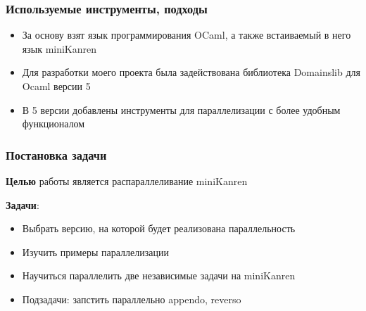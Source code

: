\documentclass{beamer}
\begin{document}
\begin{frame}
  \frametitle{Используемые инструменты, подходы}
  \begin{itemize}
    \item За основу взят язык программирования OCaml, а также встаиваемый в него язык miniKanren
    \item Для разработки моего проекта была задействована библиотека Domainslib для Ocaml версии 5
    \item В 5 версии добавлены инструменты для параллелизации с более удобным функционалом
  \end{itemize}

\end{frame}



\begin{frame}
  \frametitle{Постановка задачи}
  \textbf{Целью} работы является распараллеливание miniKanren %

  \textbf{Задачи}:
  \begin{itemize}
    \item Выбрать версию, на которой будет реализована параллельность 
    \item Изучить примеры параллелизации
    \item Научиться параллелить две независимые задачи на miniKanren
    \item Подзадачи: запстить параллельно appendo, reverso
  \end{itemize}
\end{frame}
\end{document}

